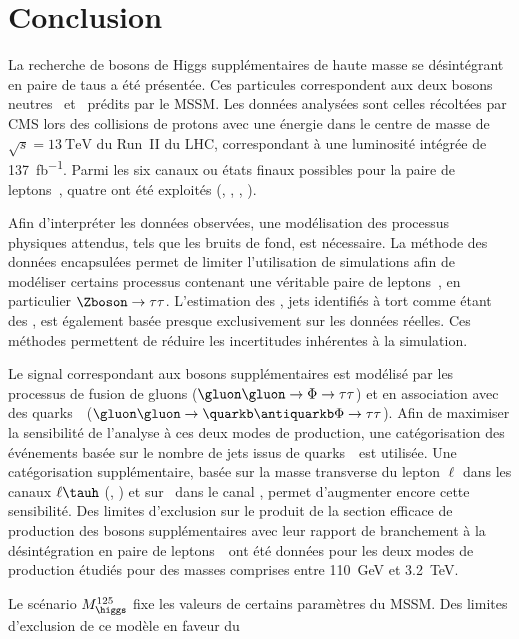 \section{Conclusion}\label{chapter-HTT_analysis-section-conclusion}
La recherche de bosons de Higgs supplémentaires de haute masse se désintégrant en paire de taus
a été présentée.
Ces particules correspondent aux deux bosons neutres \Higgs\ et \HiggsA\ prédits par le MSSM.
Les données analysées sont celles récoltées par CMS
lors des collisions de protons avec une énergie dans le centre de masse de $\sqrt{s}=\SI{13}{\TeV}$ du Run~II du LHC,
correspondant à une luminosité intégrée de \SI{137}{\femto\barn^{-1}}.
Parmi les six canaux ou états finaux possibles pour la paire de leptons~\tau,
quatre ont été exploités (\tauh\tauh, \mu\tauh, \ele\tauh, \ele\mu).
\par
Afin d'interpréter les données observées,
une modélisation des processus physiques attendus, tels que les bruits de fond,
est nécessaire.
La méthode des données encapsulées permet de limiter l'utilisation de simulations afin de modéliser
certains processus contenant une véritable paire de leptons~\tau,
en particulier $\Zboson\to\tau\tau$.
L'estimation des \ftauhs, jets identifiés à tort comme étant des \tauh,
est également basée presque exclusivement sur les données réelles.
Ces méthodes permettent de réduire les incertitudes inhérentes à la simulation.
\par
Le signal correspondant aux bosons supplémentaires est modélisé par les processus
de fusion de gluons ($\gluon\gluon\to\Phi\to\tau\tau$)
et
en association avec des quarks~\quarkb\ ($\gluon\gluon\to\quarkb\antiquarkb\Phi\to\tau\tau$).
Afin de maximiser la sensibilité de l'analyse à ces deux modes de production,
une catégorisation des événements basée sur le nombre de jets issus de quarks~\quarkb\
est utilisée.
Une catégorisation supplémentaire, basée sur la masse transverse du lepton $\ell$ dans les canaux $\ell\tauh$ (\mu\tauh, \ele\tauh) et sur \Dzeta\ dans le canal \ele\mu, permet d'augmenter encore cette sensibilité.
Des limites d'exclusion sur le produit de la section efficace de production des bosons supplémentaires avec leur rapport de branchement à la désintégration en paire de leptons~\tau\ ont été données pour les deux modes de production étudiés pour des masses comprises entre \SI{110}{\GeV} et \SI{3.2}{\TeV}.
\par
Le scénario $M_{\higgs}^{125}$
fixe les valeurs de certains paramètres du MSSM.
Des limites d'exclusion de ce modèle
en faveur du \SM\
